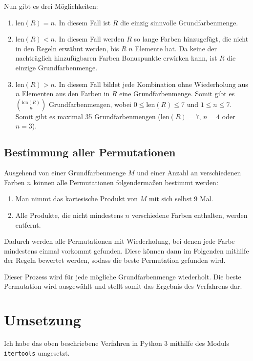 \documentclass[a4paper,10pt,ngerman]{scrartcl}
\begin{document}
Nun gibt es drei Möglichkeiten:
\begin{enumerate}
  \item $\textrm{len}(R) = n$. 
  In diesem Fall ist $R$ die einzig sinnvolle Grundfarbenmenge.
  \item $\textrm{len}(R) < n$. 
  In diesem Fall werden $R$ so lange Farben hinzugefügt, die nicht in den Regeln erwähnt werden, bis $R$ $n$ Elemente hat. 
  Da keine der nachträglich hinzufügbaren Farben Bonuspunkte erwirken kann, ist $R$ die einzige Grundfarbenmenge.
  \item $\textrm{len}(R) > n$. 
  In diesem Fall bildet jede Kombination ohne Wiederholung aus $n$ Elementen aus den Farben in $R$ eine Grundfarbenmenge.
  Somit gibt es $ \binom{\textrm{len}(R)}{n}$ Grundfarbenmengen, wobei $0 \le \textrm{len}(R) \le 7$ und $1 \le n \le 7$. 
  Somit gibt es maximal 35 Grundfarbenmengen ($\textrm{len}(R)=7$, $n=4$ oder $n=3$).
\end{enumerate}

\subsection{Bestimmung aller Permutationen}
Ausgehend von einer Grundfarbenmenge $M$ und einer Anzahl an verschiedenen Farben $n$ können alle Permutationen folgendermaßen bestimmt werden:
\begin{enumerate}
  \item Man nimmt das kartesische Produkt von $M$ mit sich selbst 9 Mal.
  \item Alle Produkte, die nicht mindestens $n$ verschiedene Farben enthalten, werden entfernt.
\end{enumerate}

Dadurch werden alle Permutationen mit Wiederholung, bei denen jede Farbe mindestens einmal vorkommt gefunden.
Diese können dann im Folgenden mithilfe der Regeln bewertet werden, sodass die beste Permutation gefunden wird.

Dieser Prozess wird für jede mögliche Grundfarbenmenge wiederholt.
Die beste Permutation wird ausgewählt und stellt somit das Ergebnis des Verfahrens dar.



\section{Umsetzung}
Ich habe das oben beschriebene Verfahren in Python 3 mithilfe des Moduls \texttt{itertools} umgesetzt.
\end{document}
